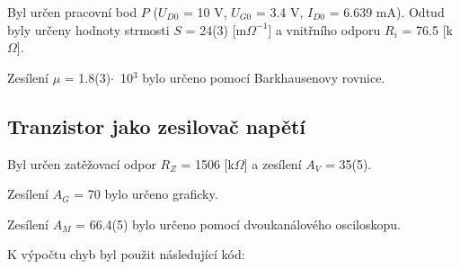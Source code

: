 \documentclass[a4paper,11pt]{article}
\begin{document}
\newpage
    \begin{minipage}[t]{0.5\textwidth} 
                \par Byl určen pracovní bod $P$ ($U_{D0}$ = 10 V, $U_{G0}$ = 3.4 V, $I_{D0}$ = 6.639 mA). Odtud byly určeny hodnoty strmosti $S$ = 24(3) [m$\Omega^{-1}$] a vnitřního odporu $R_i$ = 76.5 [k$\Omega$].
                \par Zesílení $\mu$ = 1.8(3)$\cdot$~10$^3$ bylo určeno pomocí Barkhausenovy rovnice.
    \end{minipage}
    \hspace{10pt}
    \begin{minipage}[t]{0.5\textwidth} 
            \subsection{Tranzistor jako zesilovač napětí}
                Byl určen zatěžovací odpor $R_Z$ = 1506 [k$\Omega$] a zesílení $A_V$ = 35(5).
                \par Zesílení $A_G$ = 70 bylo určeno graficky.
                \par Zesílení $A_M$ = 66.4(5) bylo určeno pomocí dvoukanálového osciloskopu.
    \end{minipage}
    \vspace{30pt}
    \par K výpočtu chyb byl použit následující kód: 
\end{document}

